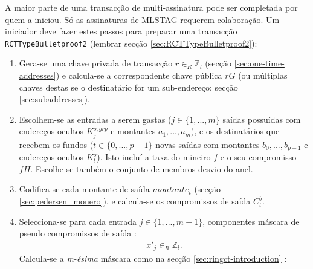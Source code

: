 A maior parte de uma transacção de multi-assinatura pode ser completada por quem a iniciou. Só as assinaturas de MLSTAG requerem colaboração. Um iniciador deve fazer estes passos para preparar uma transacção {\tt RCTTypeBulletproof2} (lembrar secção \ref{sec:RCTTypeBulletproof2}):  
\begin{enumerate}
    \item Gera-se uma chave privada de transacção $r \in_R \mathbb{Z}_l$ (secção \ref{sec:one-time-addresses}) e calcula-se a correspondente chave pública $r G$ (ou múltiplas chaves destas se o destinatário for um sub-endereço; secção \ref{sec:subaddresses}).
    \item Escolhem-se as entradas a serem gastas ($j \in \{1,...,m\}$ saídas possuídas com endereços ocultos $K^{o,grp}_j$ e montantes $a_1,...,a_m$), e os destinatários que recebem os fundos ($t \in \{0,...,p-1\}$ novas saídas com montantes $b_0,...,b_{p-1}$ e endereços ocultos $K^{o}_t$). Isto incluí a taxa do mineiro $f$ e o seu compromisso $f H$. Escolhe-se também o conjunto de membros desvio do anel.
    \item Codifica-se cada montante de saída $\mathit{montante}_t$ (secção \ref{sec:pedersen_monero}), e calcula-se os compromissos de saída $C^b_t$. 
    \item Selecciona-se para cada entrada $j \in \{1,...,m-1\}$, componentes máscara de pseudo compromissos de saída :
\begin{align*}
x'_{j} \in_R \mathbb{Z}_l .
\end{align*}
Calcula-se a {\em m-ésima} máscara como na secção \ref{sec:ringct-introduction} :

\end{enumerate}
